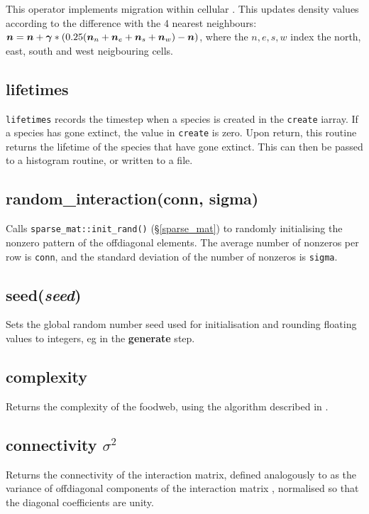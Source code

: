 \documentclass{article}
\newcommand{\bbeta}{\mbox{\boldmath{$\beta$}}}   %
\newcommand{\bgamma}{\mbox{\boldmath{$\gamma$}}} %
\newcommand{\bn}{\mbox{\boldmath{$n$}}}          %
\newcommand{\EcoLab}{{\sffamily\slshape
    \mbox{\raisebox{.5ex}{Eco}\hspace{-.4em}{\makebox[.5em]{L}ab}}}}
\begin{document}
This operator implements migration within cellular \EcoLab{}. This
updates density values according to the difference with the 4 nearest
neighbours: $\bn=\bn+\bgamma*(0.25(\bn_n+\bn_e+\bn_s+\bn_w)-\bn)$, where the
$n,e,s,w$ index the north, east, south and west neigbouring cells.

\subsection{lifetimes}\label{lifetimes}

\verb|lifetimes| records the timestep when a species is created in the
{\tt create} iarray. If a species has gone extinct, the
value in {\tt create} is zero. Upon return, this routine returns the
lifetime of the species that have gone extinct. This can then be
passed to a histogram routine, or written to a file.

\subsection{random\_interaction(conn, sigma)}\label{random_interaction}

Calls {\protect\tt sparse\_mat::init\_rand()} (\S\ref{sparse_mat}) to randomly initialising the nonzero pattern of
the offdiagonal elements. The average number of nonzeros per row is
{\tt conn}, and the standard deviation of the number of nonzeros is
{\tt sigma}.

\subsection{seed({\em seed})}

Sets the global random number seed used for initialisation and
rounding floating values to integers, eg in the {\bf generate} step.

\subsection{complexity}

Returns the complexity of the foodweb, using the algorithm described
in \cite{Standish10b}.

\subsection{connectivity $\sigma^2$}

Returns the connectivity of the interaction matrix, defined
analogously to \cite{May72} as the variance of offdiagonal components
of the interaction matrix \bbeta, normalised so that the diagonal
coefficients are unity.
\end{document}
